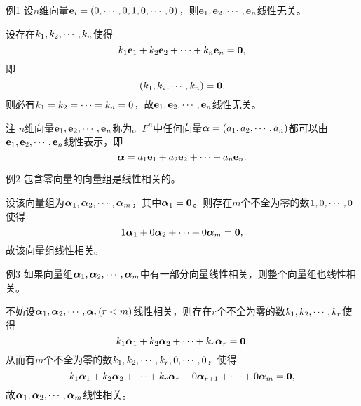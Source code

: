 \begin{frame}
  \begin{footnotesize}
    \begin{exampleblock}{例1}
      设$n$维向量$\mathbf{e}_i=(0,\cdots,0,1,0,\cdots,0)$，则$\mathbf{e}_1,\mathbf{e}_2,\cdots,\mathbf{e}_n$线性无关。
    \end{exampleblock}
    \pause
    \jiename 
    设存在$k_1,k_2,\cdots,k_n$使得
    $$
    k_1\mathbf{e}_1+k_2\mathbf{e}_2+\cdots+k_n\mathbf{e}_n=\mathbf{0},
    $$
    即
    $$
    (k_1,k_2,\cdots,k_n)=\mathbf{0},
    $$
    则必有$k_1=k_2=\cdots=k_n=0$，故$\mathbf{e}_1,\mathbf{e}_2,\cdots,\mathbf{e}_n$线性无关。

    \pause 
    \begin{block}{注}
      $n$维向量$\mathbf{e}_1,\mathbf{e}_2,\cdots,\mathbf{e}_n$称为。$F^n$中任何向量$\boldsymbol{\alpha}=(a_1,a_2,\cdots,a_n)$都可以由$\mathbf{e}_1,\mathbf{e}_2,\cdots,\mathbf{e}_n$线性表示，即
      $$
      \boldsymbol{\alpha} = a_1\mathbf{e}_1+a_2\mathbf{e}_2+\cdots+a_n\mathbf{e}_n.
      $$
    \end{block}

  \end{footnotesize}
\end{frame}


\begin{frame}
  \begin{footnotesize}
    \begin{exampleblock}{例2}
      包含零向量的向量组是线性相关的。
    \end{exampleblock}
    \pause
    \jiename
    设该向量组为$\boldsymbol{\alpha}_1,\boldsymbol{\alpha}_2,\cdots,\boldsymbol{\alpha}_m$，其中$\boldsymbol{\alpha}_1=\mathbf{0}$。则存在$m$个不全为零的数$1,0,\cdots,0$使得
    $$
    1 \boldsymbol{\alpha}_1+0\boldsymbol{\alpha}_2+\cdots+0\boldsymbol{\alpha}_m=\mathbf{0},
    $$
    故该向量组线性相关。

  \end{footnotesize}
\end{frame}


\begin{frame}
  \begin{footnotesize}
    \begin{exampleblock}{例3}
      如果向量组$\boldsymbol{\alpha}_1,\boldsymbol{\alpha}_2,\cdots,\boldsymbol{\alpha}_m$中有一部分向量线性相关，则整个向量组也线性相关。
    \end{exampleblock}
    \pause
    \proofname
    不妨设$\boldsymbol{\alpha}_1,\boldsymbol{\alpha}_2,\cdots,\boldsymbol{\alpha}_r(r<m)$线性相关，则存在$r$个不全为零的数$k_1,k_2,\cdots,k_r$使得
    $$
    k_1\boldsymbol{\alpha}_1+k_2\boldsymbol{\alpha}_2+\cdots+k_r\boldsymbol{\alpha}_r=\mathbf{0},
    $$
    从而有$m$个不全为零的数$k_1,k_2,\cdots,k_r,0,\cdots,0$，使得
    $$
    k_1\boldsymbol{\alpha}_1+k_2\boldsymbol{\alpha}_2+\cdots+k_r\boldsymbol{\alpha}_r+0\boldsymbol{\alpha}_{r+1}+\cdots+0\boldsymbol{\alpha}_m=\mathbf{0},
    $$
    故$\boldsymbol{\alpha}_1,\boldsymbol{\alpha}_2,\cdots,\boldsymbol{\alpha}_m$线性相关。
  \end{footnotesize}
\end{frame}

